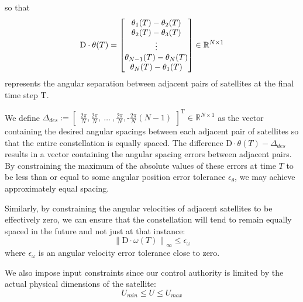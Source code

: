 \documentclass[letterpaper, 10 pt, conference]{ieeeconf}  %
\begin{document}
so that
\begin{equation}
\text{D} \cdot \theta(T)
 = 
\renewcommand{\arraystretch}{1.00}
\begin{bmatrix} \theta_1(T) - \theta_2(T) \\ \theta_2(T) - \theta_3(T) \\ \vdots \\ \theta_{N-1}(T) - \theta_N(T) \\ \theta_{N}(T) - \theta_1(T) \end{bmatrix} \in \mathbb{R}^{N\times1}
\end{equation}
represents the angular separation between adjacent pairs of satellites at the final time step $\text{T}$.

We define $\Delta_{des} := \begin{bmatrix} \frac{2\pi}{N},\frac{2\pi}{N}, \ \hdots \ , \frac{2\pi}{N}, \text{-}\frac{2\pi}{N}(N-1) \end{bmatrix}^\text{T}  \in \mathbb{R}^{N\times1}$ as the vector containing the desired angular spacings between each adjacent pair of satellites so that the entire constellation is equally spaced. The difference $\text{D} \cdot \theta(T)-\Delta_{des}$ results in a vector containing the angular spacing errors between adjacent pairs. By constraining the maximum of the absolute values of these errors at time $T$ to be less than or equal to some angular position error tolerance $\epsilon_{\theta}$, we may achieve approximately equal spacing.

Similarly, by constraining the angular velocities of adjacent satellites to be effectively zero, we can ensure that the constellation will tend to remain equally spaced in the future and not just at that instance:
\begin{equation}
{\lVert \text{D} \cdot \omega(T) \rVert}_{\infty} \leq \epsilon_{\omega} 
\end{equation}
where $\epsilon_{\omega}$ is an angular velocity error tolerance close to zero. 

We also impose input constraints since our control authority is limited by the actual physical dimensions of the satellite:
\begin{equation}
U_{min}  \leq U \leq U_{max}
\end{equation}
\end{document}
